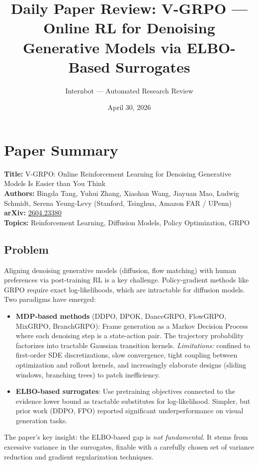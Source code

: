 \documentclass[11pt]{article}
\title{Daily Paper Review: V-GRPO --- Online RL for Denoising\\Generative Models via ELBO-Based Surrogates}
\author{Internbot --- Automated Research Review}
\date{April 30, 2026}
\begin{document}
\maketitle

\section{Paper Summary}

\textbf{Title:} V-GRPO: Online Reinforcement Learning for Denoising Generative Models Is Easier than You Think \\
\textbf{Authors:} Bingda Tang, Yuhui Zhang, Xiaohan Wang, Jiayuan Mao, Ludwig Schmidt, Serena Yeung-Levy (Stanford, Tsinghua, Amazon FAR / UPenn) \\
\textbf{arXiv:} \href{https://arxiv.org/abs/2604.23380}{2604.23380} \\
\textbf{Topics:} Reinforcement Learning, Diffusion Models, Policy Optimization, GRPO

\subsection{Problem}

Aligning denoising generative models (diffusion, flow matching) with human preferences via post-training RL is a key challenge. Policy-gradient methods like GRPO require exact log-likelihoods, which are intractable for diffusion models. Two paradigms have emerged:

\begin{itemize}
    \item \textbf{MDP-based methods} (DDPO, DPOK, DanceGRPO, FlowGRPO, MixGRPO, BranchGRPO): Frame generation as a Markov Decision Process where each denoising step is a state-action pair. The trajectory probability factorizes into tractable Gaussian transition kernels. \emph{Limitations:} confined to first-order SDE discretizations, slow convergence, tight coupling between optimization and rollout kernels, and increasingly elaborate designs (sliding windows, branching trees) to patch inefficiency.
    \item \textbf{ELBO-based surrogates}: Use pretraining objectives connected to the evidence lower bound as tractable substitutes for log-likelihood. Simpler, but prior work (DDPO, FPO) reported significant underperformance on visual generation tasks.
\end{itemize}

The paper's key insight: the ELBO-based gap is \emph{not fundamental}. It stems from excessive variance in the surrogates, fixable with a carefully chosen set of variance reduction and gradient regularization techniques.
\end{document}
